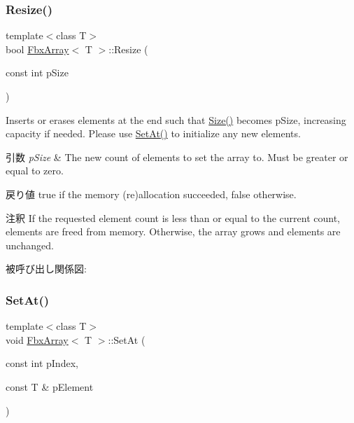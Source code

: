 \subsubsection{\texorpdfstring{Resize()}{Resize()}}
{\footnotesize\ttfamily template$<$class T$>$ \\
bool \hyperlink{class_fbx_array}{Fbx\+Array}$<$ T $>$\+::Resize (\begin{DoxyParamCaption}\item[{const int}]{p\+Size }\end{DoxyParamCaption})}

Inserts or erases elements at the end such that \hyperlink{class_fbx_array_aa76a0ceaf4b13a2acec7c0cdd1c08362}{Size()} becomes p\+Size, increasing capacity if needed. Please use \hyperlink{class_fbx_array_a5229637f8e7dbee48fb8af9d03ecde14}{Set\+At()} to initialize any new elements. 
\begin{DoxyParams}{引数}
{\em p\+Size} & The new count of elements to set the array to. Must be greater or equal to zero. \\
\hline
\end{DoxyParams}
\begin{DoxyReturn}{戻り値}
{\ttfamily true} if the memory (re)allocation succeeded, {\ttfamily false} otherwise. 
\end{DoxyReturn}
\begin{DoxyRemark}{注釈}
If the requested element count is less than or equal to the current count, elements are freed from memory. Otherwise, the array grows and elements are unchanged. 
\end{DoxyRemark}
被呼び出し関係図\+:
\mbox{\label{class_fbx_array_a5229637f8e7dbee48fb8af9d03ecde14}} 
\subsubsection{\texorpdfstring{Set\+At()}{SetAt()}}
{\footnotesize\ttfamily template$<$class T$>$ \\
void \hyperlink{class_fbx_array}{Fbx\+Array}$<$ T $>$\+::Set\+At (\begin{DoxyParamCaption}\item[{const int}]{p\+Index,  }\item[{const T \&}]{p\+Element }\end{DoxyParamCaption})}


